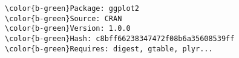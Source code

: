 \documentclass[class=minimal,border=0]{standalone}
\begin{document}
%
\begin{BVerbatim}[bgcolor=b-darkgrey]
\color{b-green}Package: ggplot2
\color{b-green}Source: CRAN
\color{b-green}Version: 1.0.0
\color{b-green}Hash: c8bff66238347472f08b6a35608539ff
\color{b-green}Requires: digest, gtable, plyr...
\end{BVerbatim}
\end{document}
